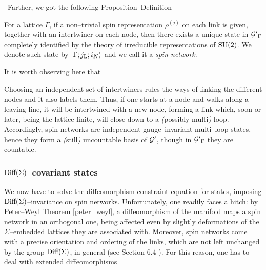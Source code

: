  \,\newline
 Farther, we got the following Proposition--Definition
\begin{defi}
    For a lattice $\Gamma$, if a non--trivial spin representation $\rho^{(j)}$ on each link is given, together with an intertwiner on each node, then there exists a unique state in ${\mathcal{G}'}_\Gamma$ completely identified by the theory of irreducible representations of $\text{\normalfont SU}(2)$. We denote such state by $\left| \Gamma;j_{\text{\normalfont L}};i_N \right >$ and we call it a \emph{spin network}.
\end{defi}
It is worth observing here that
\begin{remark}
    Choosing an independent set of intertwiners rules the ways of linking the different nodes and it also labels them. Thus, if one starts at a node and walks along a leaving line, it will be intertwined with a new node, forming a link which, soon or later, being the lattice finite, will close down to a \emph{(}possibly multi\emph{)} loop. Accordingly, spin networks are independent gauge--invariant multi--loop states, hence they form a \emph{(}still\emph{)} uncountable basis of $\mathcal{G}'$, though in ${\mathcal{G}'}_\Gamma$ they are countable.
\end{remark}


\subsubsection{\texorpdfstring{$\text{\normalfont Diff}(\Sigma)$}{a}--covariant states}
We now have to solve the diffeomorphism constraint equation for states, imposing $\text{\normalfont Diff}(\Sigma)$--invariance on spin networks. Unfortunately, one readily faces a hitch: by Peter--Weyl Theorem \ref{peter_weyl}, a diffeomorphism of the manifold maps a spin network in an orthogonal one, being affected even by slightly deformations of the $\Sigma$--embedded lattices they are associated with. Moreover, spin networks come with a precise orientation and ordering of the links, which are not left unchanged by the group $\text{\normalfont Diff}(\Sigma)$, in general (see Section 6.4 \cite{rov1}). For this reason, one has to deal with extended diffeomorphisms


